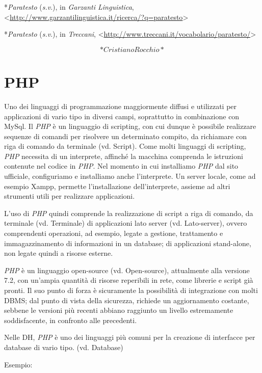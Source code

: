 \documentclass[
  b5paper,
  twoside,
  11pt,
  chapterprefix=false,
  bibliography=totocnumbered,
  listof=flat]{scrbook}
\begin{document}
*\emph{Paratesto} (\emph{s.v}.), in \emph{Garzanti Linguistica},
\textless{}{\url{http://www.garzantilinguistica.it/ricerca/?q=paratesto}\textgreater{}}

*\emph{Paratesto} (\emph{s.v}.), in \emph{Treccani},
\textless{}\href{http://www.treccani.it/vocabolario/paratesto/}{{http://www.treccani.it/vocabolario/paratesto/}}\textgreater{}

\[*Cristiano Rocchio*\]

\hypertarget{php}{%
\chapter{PHP}\label{php}}

Uno dei linguaggi di programmazione maggiormente diffusi e utilizzati
per applicazioni di vario tipo in diversi campi, soprattutto in
combinazione con MySql. Il \emph{PHP} è un linguaggio di scripting, con cui
dunque è possibile realizzare sequenze di comandi per risolvere un
determinato compito, da richiamare con riga di comando da terminale (vd.
Script). Come molti linguaggi di scripting, \emph{PHP} necessita di un
interprete, affinché la macchina comprenda le istruzioni contenute nel
codice in \emph{PHP}. Nel momento in cui installiamo \emph{PHP} dal sito
ufficiale, configuriamo e installiamo anche l'interprete. Un server
locale, come ad esempio Xampp, permette l'installazione dell'interprete,
assieme ad altri strumenti utili per realizzare applicazioni.

L'uso di \emph{PHP} quindi comprende la realizzazione di script a riga di
comando, da terminale (vd. Terminale) di applicazioni lato server (vd.
Lato-server), ovvero comprendenti operazioni, ad esempio, legate a
gestione, trattamento e immagazzinamento di informazioni in un database;
di applicazioni stand-alone, non legate quindi a risorse esterne.

\emph{PHP} è un linguaggio open-source (vd. Open-source), attualmente alla
versione 7.2, con un'ampia quantità di risorse reperibili in rete, come
librerie e script già pronti. Il suo punto di forza è sicuramente la
possibilità di integrazione con molti DBMS; dal punto di vista della
sicurezza, richiede un aggiornamento costante, sebbene le versioni più
recenti abbiano raggiunto un livello estremamente soddisfacente, in
confronto alle precedenti.

Nelle DH, \emph{PHP} è uno dei linguaggi più comuni per la creazione di
interfacce per database di vario tipo. (vd. Database)

Esempio:
\end{document}
